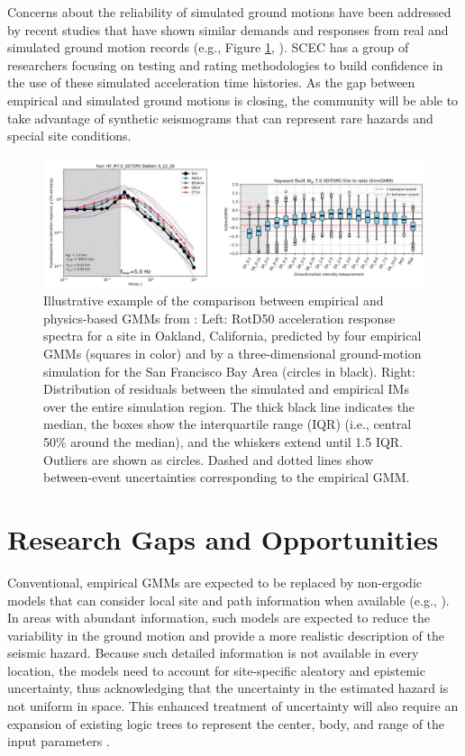 Concerns about the reliability of simulated ground motions have been addressed by recent studies that have shown similar demands and responses from real and simulated ground motion records (e.g., Figure \ref{fig:haz_EmpricalVsSimulated}, \cite{galasso2013validation, rodgers2019broadband}). SCEC has a group of researchers focusing on testing and rating methodologies to build confidence in the use of these simulated acceleration time histories. As the gap between empirical and simulated ground motions is closing, the community will be able to take advantage of synthetic seismograms that can represent rare hazards and special site conditions.

\begin{figure}[htb]
    \centering
    \includegraphics[width=1.0\textwidth, angle = 0]{Figures/EmpiricalVsSimulated.pdf}
    \caption{Illustrative example of the comparison between empirical and physics-based GMMs from \citep{rodgers2019broadband}: Left: RotD50 acceleration response spectra for a site in Oakland, California, predicted by four empirical GMMs (squares in color) and by a three-dimensional ground-motion simulation for the San Francisco Bay Area (circles in black). Right: Distribution of residuals between the simulated and empirical IMs over the entire simulation region. The thick black line indicates the median, the boxes show the interquartile range (IQR) (i.e., central 50\% around the median), and the whiskers extend until 1.5 IQR. Outliers are shown as circles. Dashed and dotted lines show between-event uncertainties corresponding to the empirical GMM.}
    \label{fig:haz_EmpricalVsSimulated}
\end{figure}

\section{Research Gaps and Opportunities}
\label{sec:eq_shake_gaps}

Conventional, empirical GMMs are expected to be replaced by non-ergodic models that can consider local site and path information when available (e.g., \cite{abrahamson2019probabilistic}). In areas with abundant information, such models are expected to reduce the variability in the ground motion and provide a more realistic description of the seismic hazard. Because such detailed information is not available in every location, the models need to account for site-specific aleatory and epistemic uncertainty, thus acknowledging that the uncertainty in the estimated hazard is not uniform in space. This enhanced treatment of uncertainty will also require an expansion of existing logic trees to represent the center, body, and range of the input parameters \citep{gerstenberger2020seismic}.

